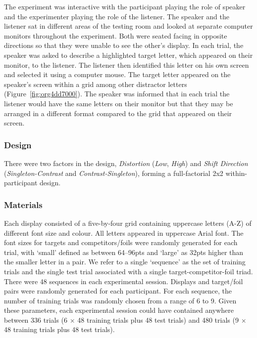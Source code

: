 \documentclass[natbib,man,a4paper]{apa6}
\begin{document}
The experiment was interactive with the participant playing the role of speaker and the experimenter playing the role of the listener. The speaker and the listener sat in different areas of the testing room and looked at separate computer monitors throughout the experiment. Both were seated facing in opposite directions so that they were unable to see the other's display. In each trial, the speaker was asked to describe a highlighted target letter, which appeared on their monitor, to the listener. The listener then identified this letter on his own screen and selected it using a computer mouse. The target letter appeared on the speaker’s screen within a grid among other distractor letters (Figure~\ref{fig:org4dd7000}). The speaker was informed that in each trial the listener would have the same letters on their monitor but that they may be arranged in a different format compared to the grid that appeared on their screen.

\subsubsection*{Design}
\label{sec:orgc529c3c}

There were two factors in the design, \emph{Distortion} (\emph{Low}, \emph{High}) and \emph{Shift Direction} (\emph{Singleton-Contrast} and \emph{Contrast-Singleton}), forming a full-factorial 2x2 within-participant design.

\subsubsection*{Materials}
\label{sec:org75c04bf}

Each display consisted of a five-by-four grid containing uppercase letters (A-Z) of different font size and colour. All letters appeared in uppercase Arial font. The font sizes for targets and competitors/foils were randomly generated for each trial, with `small' defined as between 64--96pts and `large' as 32pts higher than the smaller letter in a pair.  We refer to a single `sequence' as the set of training trials and the single test trial associated with a single target-competitor-foil triad. There were 48 sequences in each experimental session. Displays and target/foil pairs were randomly generated for each participant. For each sequence, the number of training trials was randomly chosen from a range of 6 to 9. Given these parameters, each experimental session could have contained anywhere between 336 trials (6 \(\times\) 48 training trials plus 48 test trials) and 480 trials (9 \(\times\) 48 training trials plus 48 test trials).  
\end{document}
